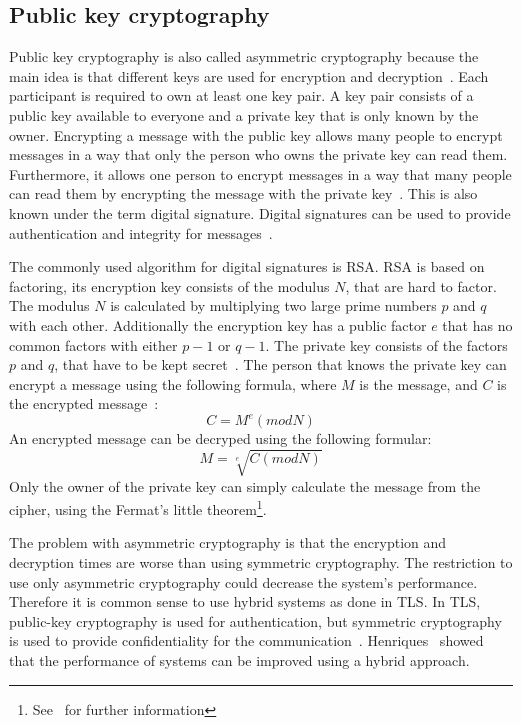 \subsection{Public key cryptography}
Public key cryptography is also called asymmetric cryptography because the main idea is that different keys are used for encryption and decryption~\cite{anderson2020security}.
Each participant is required to own at least one key pair.
A key pair consists of a public key available to everyone and a private key that is only known by the owner.
Encrypting a message with the public key allows many people to encrypt messages in a way that only the person who owns the private key can read them.
Furthermore, it allows one person to encrypt messages in a way that many people can read them by encrypting the message with the private key~\cite{henriques2017using}.
This is also known under the term digital signature. 
Digital signatures can be used to provide authentication and integrity for messages~\cite{anderson2020security}.

The commonly used algorithm for digital signatures is RSA.
RSA is based on factoring, its encryption key consists of the modulus $N$, that are hard to factor.
The modulus $N$ is calculated by multiplying two large prime numbers $p$ and $q$ with each other.
Additionally the encryption key has a public factor $e$ that has no common factors with either $p-1$ or $q-1$.
The private key consists of the factors $p$ and $q$, that have to be kept secret~\cite{anderson2020security}.
The person that knows the private key can encrypt a message using the following formula, where $M$ is the message, and $C$ is the encrypted message~\cite{anderson2020security}:
\begin{displaymath}
	C = M^e (mod N)
\end{displaymath}
An encrypted message can be decryped using the following formular:
\begin{displaymath}
	M = \sqrt[e]{C (mod N)}
\end{displaymath}
Only the owner of the private key can simply calculate the message from the cipher, using the Fermat's little theorem\footnote{See~\cite{fermatlittle} for further information}.

The problem with asymmetric cryptography is that the encryption and decryption times are worse than using symmetric cryptography.
The restriction to use only asymmetric cryptography could decrease the system's performance.
Therefore it is common sense to use hybrid systems as done in TLS.
In TLS, public-key cryptography is used for authentication, but symmetric cryptography is used to provide confidentiality for the communication~\cite{henriques2017using}.
Henriques~\cite{henriques2017using} showed that the performance of systems can be improved using a hybrid approach.

